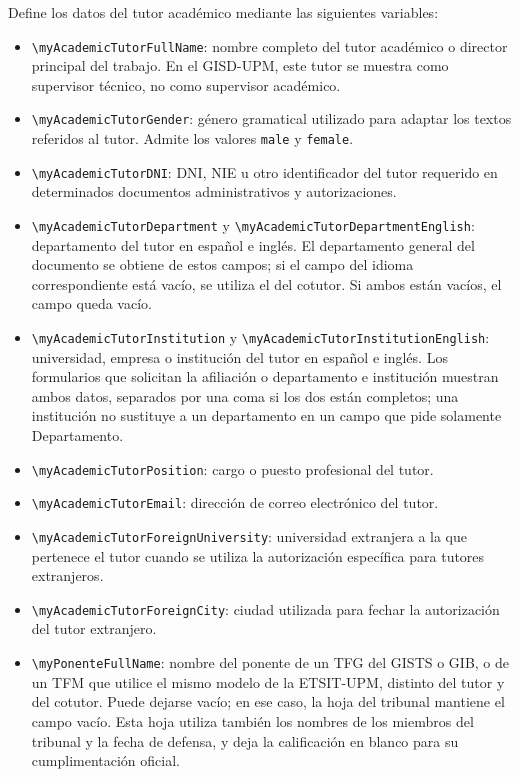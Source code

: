 Define los datos del tutor académico mediante las siguientes variables:

\begin{itemize}
  \item \texttt{\textbackslash{}myAcademicTutorFullName}: nombre completo del tutor académico o director principal del trabajo. En el GISD-UPM, este tutor se muestra como supervisor técnico, no como supervisor académico.
  \item \texttt{\textbackslash{}myAcademicTutorGender}: género gramatical utilizado para adaptar los textos referidos al tutor. Admite los valores \texttt{male} y \texttt{female}.
  \item \texttt{\textbackslash{}myAcademicTutorDNI}: DNI, NIE u otro identificador del tutor requerido en determinados documentos administrativos y autorizaciones.
  \item \texttt{\textbackslash{}myAcademicTutorDepartment} y \texttt{\textbackslash{}myAcademicTutorDepartmentEnglish}: departamento del tutor en español e inglés. El departamento general del documento se obtiene de estos campos; si el campo del idioma correspondiente está vacío, se utiliza el del cotutor. Si ambos están vacíos, el campo queda vacío.
  \item \texttt{\textbackslash{}myAcademicTutorInstitution} y \texttt{\textbackslash{}myAcademicTutorInstitutionEnglish}: universidad, empresa o institución del tutor en español e inglés. Los formularios que solicitan la afiliación o departamento e institución muestran ambos datos, separados por una coma si los dos están completos; una institución no sustituye a un departamento en un campo que pide solamente Departamento.
  \item \texttt{\textbackslash{}myAcademicTutorPosition}: cargo o puesto profesional del tutor.
  \item \texttt{\textbackslash{}myAcademicTutorEmail}: dirección de correo electrónico del tutor.
  \item \texttt{\textbackslash{}myAcademicTutorForeignUniversity}: universidad extranjera a la que pertenece el tutor cuando se utiliza la autorización específica para tutores extranjeros.
  \item \texttt{\textbackslash{}myAcademicTutorForeignCity}: ciudad utilizada para fechar la autorización del tutor extranjero.
  \item \texttt{\textbackslash{}myPonenteFullName}: nombre del ponente de un TFG del GISTS o GIB, o de un TFM que utilice el mismo modelo de la ETSIT-UPM, distinto del tutor y del cotutor. Puede dejarse vacío; en ese caso, la hoja del tribunal mantiene el campo vacío. Esta hoja utiliza también los nombres de los miembros del tribunal y la fecha de defensa, y deja la calificación en blanco para su cumplimentación oficial.

\end{itemize}
